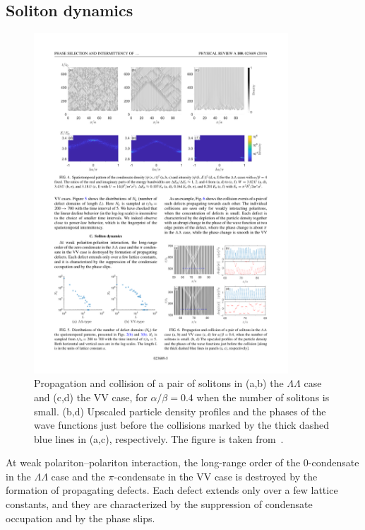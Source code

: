 %
%
\subsection{Soliton dynamics}
%
%
%
\begin{figure}[ht]
\centering
\includegraphics[width=0.85\textwidth]{Fig/Ch4/fig6.pdf}
\caption[Propagation and collision of solitons]{Propagation and collision of a pair of solitons in (a,b) the $\Lambda\Lambda$ case and (c,d) the VV case, for $\alpha/\beta=0.4$ when the number of solitons is small. (b,d) Upscaled particle density profiles and the phases of the wave functions just before the collisions marked by the thick dashed blue lines in (a,c), respectively. The figure is taken from~\cite{Yoon:2019aa}.}
\label{CH4_fig:4}
\end{figure}
%
%
%

At weak polariton--polariton interaction, the long-range order of the $0$-condensate in the $\Lambda\Lambda$ case and the $\pi$-condensate in the VV case is destroyed by the formation of propagating defects.
Each defect extends only over a few lattice constants, and they are characterized by the suppression of condensate occupation and by the phase slips.

